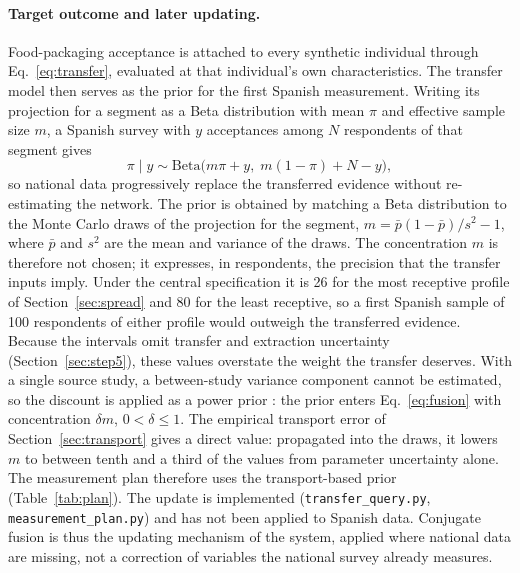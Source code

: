 \paragraph{Target outcome and later updating.}
Food-packaging acceptance is attached to every synthetic individual through
Eq.~\eqref{eq:transfer}, evaluated at that individual's own characteristics.
The transfer model then serves as the prior for the first Spanish measurement.
Writing its projection for a segment as a Beta distribution with mean $\pi$ and
effective sample size $m$, a Spanish survey with $y$ acceptances among $N$
respondents of that segment gives
\begin{equation}
\pi \mid y \sim \mathrm{Beta}\bigl(m\pi + y,\; m(1-\pi) + N - y\bigr),
\label{eq:fusion}
\end{equation}
so national data progressively replace the transferred evidence without
re-estimating the network. The prior is obtained by matching a Beta
distribution to the Monte Carlo draws of the projection for the segment,
$m = \bar{p}(1-\bar{p})/s^2 - 1$, where $\bar{p}$ and $s^2$ are the mean and
variance of the draws. The concentration $m$ is therefore not chosen; it
expresses, in respondents, the precision that the transfer inputs imply. Under
the central specification it is 26 for the most receptive profile of
Section~\ref{sec:spread} and 80 for the least receptive, so a first Spanish
sample of 100 respondents of either profile would outweigh the transferred
evidence. Because the intervals omit transfer and extraction uncertainty
(Section~\ref{sec:step5}), these values overstate the weight the transfer
deserves. With a single source study, a between-study variance component cannot
be estimated, so the discount is applied as a power prior \citep{ibrahim2000}:
the prior enters Eq.~\eqref{eq:fusion} with concentration $\delta m$,
$0 < \delta \leq 1$. The empirical transport error of
Section~\ref{sec:transport} gives a direct value: propagated into the draws,
it lowers $m$ to between %
tenth and a third of the values from parameter uncertainty alone. The measurement plan
therefore uses the transport-based prior (Table~\ref{tab:plan}). The update is implemented
(\texttt{transfer\_query.py}, \texttt{measurement\_plan.py}) and has not been
applied to Spanish data. Conjugate fusion is thus the updating mechanism of
the system, applied where national data are missing, not a correction of
variables the national survey already measures.

